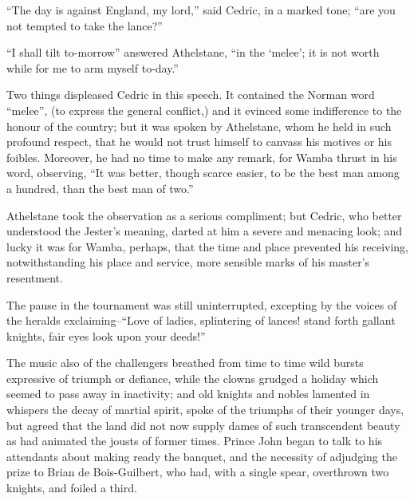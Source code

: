 ``The day is against England, my lord,'' said Cedric, in a marked tone;
``are you not tempted to take the lance?''

``I shall tilt to-morrow'' answered Athelstane, ``in the `melee'; it is
not worth while for me to arm myself to-day.''

Two things displeased Cedric in this speech. It contained the Norman
word ``melee'', (to express the general conflict,) and it evinced some
indifference to the honour of the country; but it was spoken by
Athelstane, whom he held in such profound respect, that he would not
trust himself to canvass his motives or his foibles. Moreover, he had no
time to make any remark, for Wamba thrust in his word, observing, ``It
was better, though scarce easier, to be the best man among a hundred,
than the best man of two.''

Athelstane took the observation as a serious compliment; but Cedric, who
better understood the Jester's meaning, darted at him a severe and
menacing look; and lucky it was for Wamba, perhaps, that the time and
place prevented his receiving, notwithstanding his place and service,
more sensible marks of his master's resentment.

The pause in the tournament was still uninterrupted, excepting by the
voices of the heralds exclaiming--``Love of ladies, splintering of
lances! stand forth gallant knights, fair eyes look upon your deeds!''

The music also of the challengers breathed from time to time wild bursts
expressive of triumph or defiance, while the clowns grudged a holiday
which seemed to pass away in inactivity; and old knights and nobles
lamented in whispers the decay of martial spirit, spoke of the triumphs
of their younger days, but agreed that the land did not now supply dames
of such transcendent beauty as had animated the jousts of former times.
Prince John began to talk to his attendants about making ready the
banquet, and the necessity of adjudging the prize to Brian de
Bois-Guilbert, who had, with a single spear, overthrown two knights, and
foiled a third.

